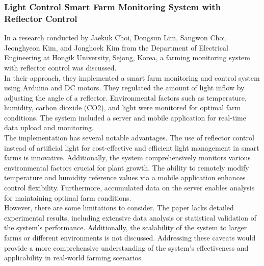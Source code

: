 \documentclass[12pt, a4paper]{article}
\begin{document}
\subsubsection{Light Control Smart Farm Monitoring System with Reflector Control}
In a research conducted by Jaekuk Choi, Dongsun Lim, Sangwon Choi, Jeonghyeon Kim, and Jonghoek Kim \cite{choi2020light} from the Department of Electrical Engineering at Hongik University, Sejong, Korea, a farming monitoring system with reflector control was discussed.\\
In their approach, they implemented a smart farm monitoring and control system using Arduino and DC motors. They regulated the amount of light inflow by adjusting the angle of a reflector. Environmental factors such as temperature, humidity, carbon dioxide (CO2), and light were monitored for optimal farm conditions. The system included a server and mobile application for real-time data upload and monitoring.\\
The implementation has several notable advantages. The use of reflector control instead of artificial light for cost-effective and efficient light management in smart farms is innovative. Additionally, the system comprehensively monitors various environmental factors crucial for plant growth. The ability to remotely modify temperature and humidity reference values via a mobile application enhances control flexibility. Furthermore, accumulated data on the server enables analysis for maintaining optimal farm conditions.\\
However, there are some limitations to consider. The paper lacks detailed experimental results, including extensive data analysis or statistical validation of the system's performance. Additionally, the scalability of the system to larger farms or different environments is not discussed. Addressing these caveats would provide a more comprehensive understanding of the system's effectiveness and applicability in real-world farming scenarios.
\end{document}
